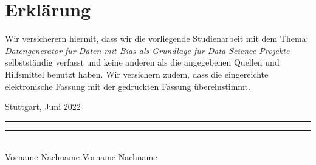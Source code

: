 
\thispagestyle{empty}

\section*{Erklärung}

\vspace*{2em}
Wir versicherern hiermit, dass wir die vorliegende Studienarbeit mit dem Thema: \textit{Datengenerator für Daten mit Bias als Grundlage für Data Science Projekte} selbstständig verfasst und keine anderen als die angegebenen Quellen und Hilfsmittel benutzt haben. Wir versichern zudem, dass die eingereichte elektronische Fassung mit der gedruckten Fassung übereinstimmt. 

\vspace{3em}

Stuttgart, Juni 2022
\vspace{3em} \\
\rule{6cm}{0.4pt} \quad \quad \rule{6cm}{0.4pt}\\
Vorname Nachname \hspace{3.1cm} Vorname Nachname